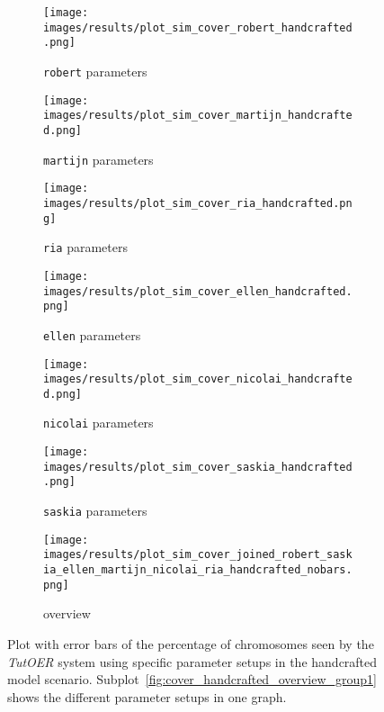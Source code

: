 \begin{figure}[ht]
	\begin{subfigure}{0.48\linewidth}
	\texttt{[image: images/results/plot\_sim\_cover\_robert\_handcrafted.png]}
	\caption{\texttt{robert} parameters}
	\label{fig:cover_handcrafted_robert}
	\end{subfigure}
	\hfill
	\begin{subfigure}{0.48\linewidth}
	\texttt{[image: images/results/plot\_sim\_cover\_martijn\_handcrafted.png]}
	\caption{\texttt{martijn} parameters}
	\label{fig:cover_handcrafted_martijn}
	\end{subfigure}
	\begin{subfigure}{0.48\linewidth}
	\texttt{[image: images/results/plot\_sim\_cover\_ria\_handcrafted.png]}
	\caption{\texttt{ria} parameters}
	\label{fig:cover_handcrafted_ria}
	\end{subfigure}
	\hfill
	\begin{subfigure}{0.48\linewidth}
	\texttt{[image: images/results/plot\_sim\_cover\_ellen\_handcrafted.png]}
	\caption{\texttt{ellen} parameters}
	\label{fig:cover_handcrafted_ellen}
	\end{subfigure}
	\begin{subfigure}{0.48\linewidth}
	\texttt{[image: images/results/plot\_sim\_cover\_nicolai\_handcrafted.png]}
	\caption{\texttt{nicolai} parameters}
	\label{fig:cover_handcrafted_nicolai}
	\end{subfigure}
	\hfill
	\begin{subfigure}{0.48\linewidth}
	\texttt{[image: images/results/plot\_sim\_cover\_saskia\_handcrafted.png]}
	\caption{\texttt{saskia} parameters}
	\label{fig:cover_handcrafted_saskia}
	\end{subfigure}
	\begin{subfigure}{\linewidth}
	\texttt{[image: images/results/plot\_sim\_cover\_joined\_robert\_saskia\_ellen\_martijn\_nicolai\_ria\_handcrafted\_nobars.png]}
	\caption{overview}
	\label{fig:cover_handcrafted_overview_group2}
	\end{subfigure}
	\caption{Plot with error bars of the percentage of chromosomes seen by the \emph{TutOER}
	system using specific parameter setups in the handcrafted model scenario.
	Subplot~\ref{fig:cover_handcrafted_overview_group1} shows the
	different parameter setups in one graph.}
	\label{fig:cover_handcrafted_container_group2}
\end{figure}


